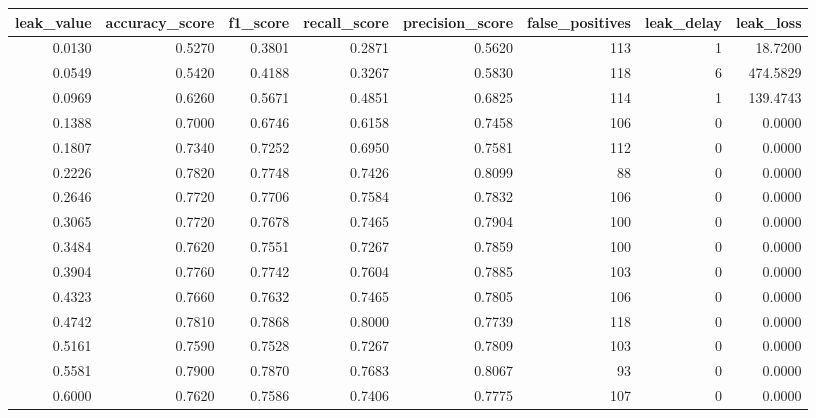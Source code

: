 \begin{tabular}{rrrrrrrr}
\toprule
leak\_value & accuracy\_score & f1\_score & recall\_score & precision\_score & false\_positives & leak\_delay & leak\_loss \\
\midrule
0.0130 & 0.5270 & 0.3801 & 0.2871 & 0.5620 & 113 & 1 & 18.7200 \\
0.0549 & 0.5420 & 0.4188 & 0.3267 & 0.5830 & 118 & 6 & 474.5829 \\
0.0969 & 0.6260 & 0.5671 & 0.4851 & 0.6825 & 114 & 1 & 139.4743 \\
0.1388 & 0.7000 & 0.6746 & 0.6158 & 0.7458 & 106 & 0 & 0.0000 \\
0.1807 & 0.7340 & 0.7252 & 0.6950 & 0.7581 & 112 & 0 & 0.0000 \\
0.2226 & 0.7820 & 0.7748 & 0.7426 & 0.8099 & 88 & 0 & 0.0000 \\
0.2646 & 0.7720 & 0.7706 & 0.7584 & 0.7832 & 106 & 0 & 0.0000 \\
0.3065 & 0.7720 & 0.7678 & 0.7465 & 0.7904 & 100 & 0 & 0.0000 \\
0.3484 & 0.7620 & 0.7551 & 0.7267 & 0.7859 & 100 & 0 & 0.0000 \\
0.3904 & 0.7760 & 0.7742 & 0.7604 & 0.7885 & 103 & 0 & 0.0000 \\
0.4323 & 0.7660 & 0.7632 & 0.7465 & 0.7805 & 106 & 0 & 0.0000 \\
0.4742 & 0.7810 & 0.7868 & 0.8000 & 0.7739 & 118 & 0 & 0.0000 \\
0.5161 & 0.7590 & 0.7528 & 0.7267 & 0.7809 & 103 & 0 & 0.0000 \\
0.5581 & 0.7900 & 0.7870 & 0.7683 & 0.8067 & 93 & 0 & 0.0000 \\
0.6000 & 0.7620 & 0.7586 & 0.7406 & 0.7775 & 107 & 0 & 0.0000 \\
\bottomrule
\end{tabular}
